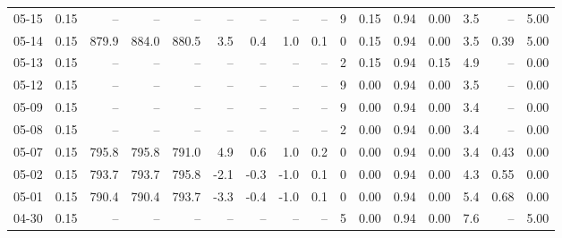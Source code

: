 \begin{threeparttable}
{\begin{tabular}{lrrrrrrrrrrrrrrr}
  05-15 &     0.15 &    -- &    -- &    -- &         -- &             -- &                       -- &                  -- &              9 &       0.15 &      0.94 &           0.00 &              3.5 &              -- &                   5.00 \\
  05-14 &     0.15 & 879.9 & 884.0 & 880.5 &        3.5 &            0.4 &                      1.0 &                 0.1 &              0 &       0.15 &      0.94 &           0.00 &              3.5 &            0.39 &                   5.00 \\
  05-13 &     0.15 &    -- &    -- &    -- &         -- &             -- &                       -- &                  -- &              2 &       0.15 &      0.94 &           0.15 &              4.9 &              -- &                   0.00 \\
  05-12 &     0.15 &    -- &    -- &    -- &         -- &             -- &                       -- &                  -- &              9 &       0.00 &      0.94 &           0.00 &              3.5 &              -- &                   0.00 \\
  05-09 &     0.15 &    -- &    -- &    -- &         -- &             -- &                       -- &                  -- &              9 &       0.00 &      0.94 &           0.00 &              3.4 &              -- &                   0.00 \\
  05-08 &     0.15 &    -- &    -- &    -- &         -- &             -- &                       -- &                  -- &              2 &       0.00 &      0.94 &           0.00 &              3.4 &              -- &                   0.00 \\
  05-07 &     0.15 & 795.8 & 795.8 & 791.0 &        4.9 &            0.6 &                      1.0 &                 0.2 &              0 &       0.00 &      0.94 &           0.00 &              3.4 &            0.43 &                   0.00 \\
  05-02 &     0.15 & 793.7 & 793.7 & 795.8 &       -2.1 &           -0.3 &                     -1.0 &                 0.1 &              0 &       0.00 &      0.94 &           0.00 &              4.3 &            0.55 &                   0.00 \\
  05-01 &     0.15 & 790.4 & 790.4 & 793.7 &       -3.3 &           -0.4 &                     -1.0 &                 0.1 &              0 &       0.00 &      0.94 &           0.00 &              5.4 &            0.68 &                   0.00 \\
  04-30 &     0.15 &    -- &    -- &    -- &         -- &             -- &                       -- &                  -- &              5 &       0.00 &      0.94 &           0.00 &              7.6 &              -- &                   5.00 \\

\end{tabular}}
\end{threeparttable}
